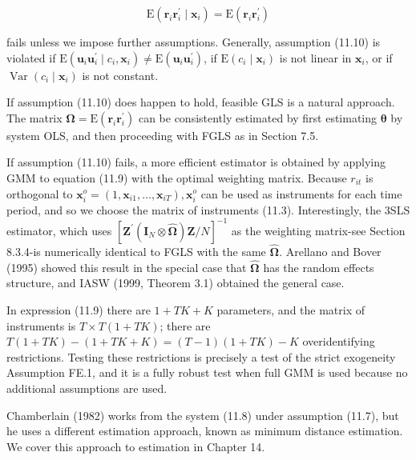 \documentclass[10pt]{article}
\begin{document}
\begin{equation*}
\mathrm{E}\left(\mathbf{r}_{i} \mathbf{r}_{i}^{\prime} \mid \mathbf{x}_{i}\right)=\mathrm{E}\left(\mathbf{r}_{i} \mathbf{r}_{i}^{\prime}\right) \tag{11.10}
\end{equation*}


fails unless we impose further assumptions. Generally, assumption (11.10) is violated if $\mathrm{E}\left(\mathbf{u}_{i} \mathbf{u}_{i}^{\prime} \mid c_{i}, \mathbf{x}_{i}\right) \neq \mathrm{E}\left(\mathbf{u}_{i} \mathbf{u}_{i}^{\prime}\right)$, if $\mathrm{E}\left(c_{i} \mid \mathbf{x}_{i}\right)$ is not linear in $\mathbf{x}_{i}$, or if $\operatorname{Var}\left(c_{i} \mid \mathbf{x}_{i}\right)$ is not constant.

If assumption (11.10) does happen to hold, feasible GLS is a natural approach. The matrix $\boldsymbol{\Omega}=\mathrm{E}\left(\mathbf{r}_{i} \mathbf{r}_{i}^{\prime}\right)$ can be consistently estimated by first estimating $\boldsymbol{\theta}$ by system OLS, and then proceeding with FGLS as in Section 7.5.

If assumption (11.10) fails, a more efficient estimator is obtained by applying GMM to equation (11.9) with the optimal weighting matrix. Because $r_{i t}$ is orthogonal to $\mathbf{x}_{i}^{o}=\left(1, \mathbf{x}_{i 1}, \ldots, \mathbf{x}_{i T}\right), \mathbf{x}_{i}^{o}$ can be used as instruments for each time period, and so we choose the matrix of instruments (11.3). Interestingly, the 3SLS estimator, which uses $\left[\mathbf{Z}^{\prime}\left(\mathbf{I}_{N} \otimes \hat{\boldsymbol{\Omega}}\right) \mathbf{Z} / N\right]^{-1}$ as the weighting matrix-see Section 8.3.4-is numerically identical to FGLS with the same $\hat{\boldsymbol{\Omega}}$. Arellano and Bover (1995) showed this result in the special case that $\hat{\boldsymbol{\Omega}}$ has the random effects structure, and IASW (1999, Theorem 3.1) obtained the general case.

In expression (11.9) there are $1+T K+K$ parameters, and the matrix of instruments is $T \times T(1+T K)$; there are $T(1+T K)-(1+T K+K)=(T-1)(1+T K) -K$ overidentifying restrictions. Testing these restrictions is precisely a test of the strict exogeneity Assumption FE.1, and it is a fully robust test when full GMM is used because no additional assumptions are used.

Chamberlain (1982) works from the system (11.8) under assumption (11.7), but he uses a different estimation approach, known as minimum distance estimation. We cover this approach to estimation in Chapter 14.
\end{document}
